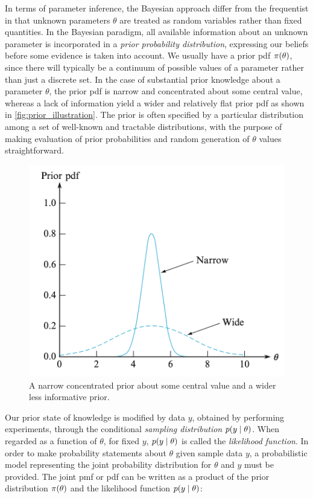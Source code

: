 In terms of parameter inference, the Bayesian approach differ from the frequentist in that unknown parameters $\theta$ are treated as random variables rather than fixed quantities. In the Bayesian paradigm, all available information about an unknown parameter is incorporated in a \textit{prior probability distribution}, expressing our beliefs before some evidence is taken into account. We usually have a prior pdf $\pi \qty(\theta)$, since there will typically be a continuum of possible values of a parameter rather than just a discrete set. In the case of substantial prior knowledge about a parameter $\theta$, the prior pdf is narrow and concentrated about some central value, whereas a lack of information yield a wider and relatively flat prior pdf as shown in \autoref{fig:prior_illustration}. The prior is often specified by a particular distribution among a set of well-known and tractable distributions, with the purpose of making evaluation of prior probabilities and random generation of $\theta$ values straightforward.

\begin{figure}[H]
    \centering
    \includegraphics[scale=0.6]{./3_Images/prior_illustration.png}
    \caption{A narrow concentrated prior about some central value and a wider less informative prior.}
    \label{fig:prior_illustration}
\end{figure}


Our prior state of knowledge is modified by data $y$, obtained by performing experiments, through the conditional \textit{sampling distribution} $p \qty(y \mid \theta)$. When regarded as a function of $\theta$, for fixed $y$, $p \qty(y \mid \theta)$ is called the \textit{likelihood function}. In order to make probability statements about $\theta$ given sample data $y$, a probabilistic model representing the joint probability distribution for $\theta$ and $y$ must be provided. The joint pmf or pdf can be written as a product of the prior distribution $\pi \qty(\theta)$ and the likelihood function $p \qty(y \mid \theta)$:

